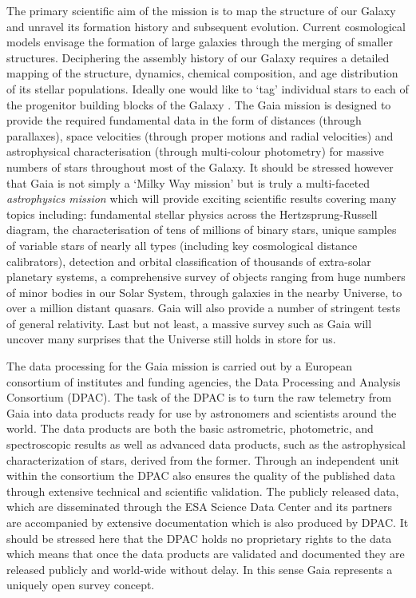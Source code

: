 The primary scientific aim of the mission is to map the structure of our Galaxy and unravel its formation history and
subsequent evolution. Current cosmological models envisage the formation of large galaxies through the merging of
smaller structures. Deciphering the assembly history of our Galaxy requires a detailed mapping of the structure,
dynamics, chemical composition, and age distribution of its stellar populations. Ideally one would like to `tag'
individual stars to each of the progenitor building blocks of the Galaxy \cite{2002ARA&A..40..487F}. The Gaia mission is
designed to provide the required fundamental data in the form of distances (through parallaxes), space velocities
(through proper motions and radial velocities) and astrophysical characterisation (through multi-colour photometry) for
massive numbers of stars throughout most of the Galaxy. It should be stressed however that Gaia is not simply a `Milky
Way mission' but is truly a multi-faceted {\em astrophysics mission} which will provide exciting scientific results
covering many topics including: fundamental stellar physics across the Hertzsprung-Russell diagram, the characterisation of
tens of millions of binary stars, unique samples of variable stars of nearly all types (including key cosmological
distance calibrators), detection and orbital classification of thousands of extra-solar planetary systems, a
comprehensive survey of objects ranging from huge numbers of minor bodies in our Solar System, through galaxies in the
nearby Universe, to over a million distant quasars. Gaia will also provide a number of stringent tests of general
relativity. Last but not least, a massive survey such as Gaia will uncover many surprises that the Universe still holds
in store for us.

The data processing for the Gaia mission is carried out by a European consortium of institutes and funding agencies, the Data Processing and Analysis Consortium (DPAC). The task of the DPAC is to turn the raw telemetry from Gaia into data products ready for use by astronomers and scientists around the world. The data products are both the basic astrometric, photometric, and spectroscopic results as well as advanced data products, such as the astrophysical characterization of stars, derived from the former. Through an independent unit within the consortium the DPAC also ensures the quality of the published data through extensive technical and scientific validation. The publicly released data, which are disseminated through the ESA Science Data Center and its partners are accompanied by extensive documentation which is also produced by DPAC. It should be stressed here that the DPAC holds no proprietary rights to the data which means that once the data products are validated and documented they are released publicly and world-wide without delay. In this sense Gaia represents a uniquely open survey concept.

